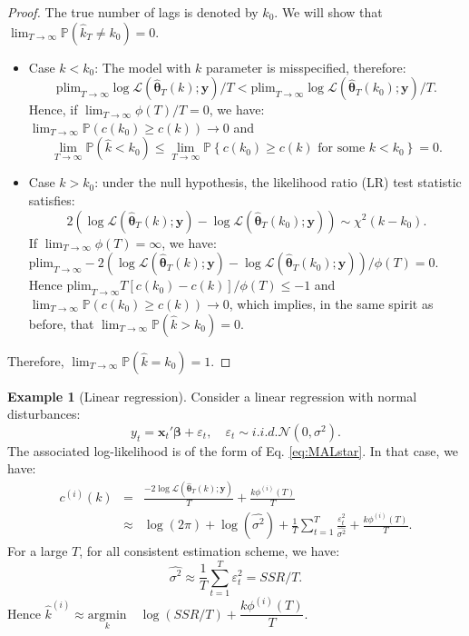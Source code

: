 \documentclass[
  12pt,
]{book}
\providecommand{\tightlist}{%
  \setlength{\itemsep}{0pt}\setlength{\parskip}{0pt}}
\theoremstyle{definition}
\theoremstyle{definition}
\newtheorem{example}{Example}[chapter]
\theoremstyle{definition}
\theoremstyle{definition}
\theoremstyle{remark}
\begin{document}
\begin{proof}
The true number of lags is denoted by \(k_0\). We will show that \(\lim_{T \rightarrow \infty} \mathbb{P}(\hat{k}_T \ne k_0)=0\).

\begin{itemize}
\tightlist
\item
  Case \(k < k_0\): The model with \(k\) parameter is misspecified, therefore:
  \[
  \mbox{plim}_{T \rightarrow \infty}  \log \mathcal{L}(\hat{\boldsymbol\theta}_T(k);\mathbf{y})/T < \mbox{plim}_{T \rightarrow \infty}  \log \mathcal{L}(\hat{\boldsymbol\theta}_T(k_0);\mathbf{y})/T.
  \]
  Hence, if \(\lim_{T \rightarrow \infty} \phi(T)/T = 0\), we have: \(\lim_{T \rightarrow \infty} \mathbb{P}(c(k_0) \ge c(k)) \rightarrow 0\) and
  \[
  \lim_{T \rightarrow \infty} \mathbb{P}(\hat{k}<k_0) \le \lim_{T \rightarrow \infty} \mathbb{P}\left\{c(k_0) \ge c(k) \mbox{ for some $k < k_0$}\right\} = 0.
  \]
\item
  Case \(k > k_0\): under the null hypothesis, the likelihood ratio (LR) test statistic satisfies:
  \[
  2 \left(\log \mathcal{L}(\hat{\boldsymbol\theta}_T(k);\mathbf{y})-\log \mathcal{L}(\hat{\boldsymbol\theta}_T(k_0);\mathbf{y})\right) \sim \chi^2(k-k_0).
  \]
  If \(\lim_{T \rightarrow \infty} \phi(T) = \infty\), we have: \(\mbox{plim}_{T \rightarrow \infty} -2 \left(\log \mathcal{L}(\hat{\boldsymbol\theta}_T(k);\mathbf{y})-\log \mathcal{L}(\hat{\boldsymbol\theta}_T(k_0);\mathbf{y})\right)/\phi(T) = 0\). Hence \(\mbox{plim}_{T \rightarrow \infty} T[c(k_0) - c(k)]/\phi(T) \le -1\) and \(\lim_{T \rightarrow \infty} \mathbb{P}(c(k_0) \ge c(k)) \rightarrow 0\), which implies, in the same spirit as before, that \(\lim_{T \rightarrow \infty} \mathbb{P}(\hat{k}>k_0) = 0\).
\end{itemize}

Therefore, \(\lim_{T \rightarrow \infty} \mathbb{P}(\hat{k}=k_0) = 1\).
\end{proof}

\begin{example}[Linear regression]
\protect\hypertarget{exm:ICOLS}{}\label{exm:ICOLS}Consider a linear regression with normal disturbances:
\[
y_t = \mathbf{x}_t' \boldsymbol\beta + \varepsilon_t, \quad \varepsilon_t \sim i.i.d. \mathcal{N}(0,\sigma^2).
\]
The associated log-likelihood is of the form of Eq. \eqref{eq:MALstar}. In that case, we have:
\begin{eqnarray*}
c^{(i)}(k) &=& \frac{- 2 \log \mathcal{L}(\hat{\boldsymbol\theta}_T(k);\mathbf{y})}{T} + \frac{k\phi^{(i)}(T)}{T}\\
&\approx& \log(2\pi) + \log(\widehat{\sigma^2}) + \frac{1}{T}\sum_{t=1}^T \frac{\varepsilon_t^2}{\widehat{\sigma^2}} + \frac{k\phi^{(i)}(T)}{T}.
\end{eqnarray*}
For a large \(T\), for all consistent estimation scheme, we have:
\[
\widehat{\sigma^2} \approx \frac{1}{T}\sum_{t=1}^T \varepsilon_t^2 = SSR/T.
\]
Hence \(\hat{k}^{(i)} \approx \underset{k}{\mbox{argmin}} \quad \log(SSR/T) + \dfrac{k\phi^{(i)}(T)}{T}\).
\end{example}
\end{document}
